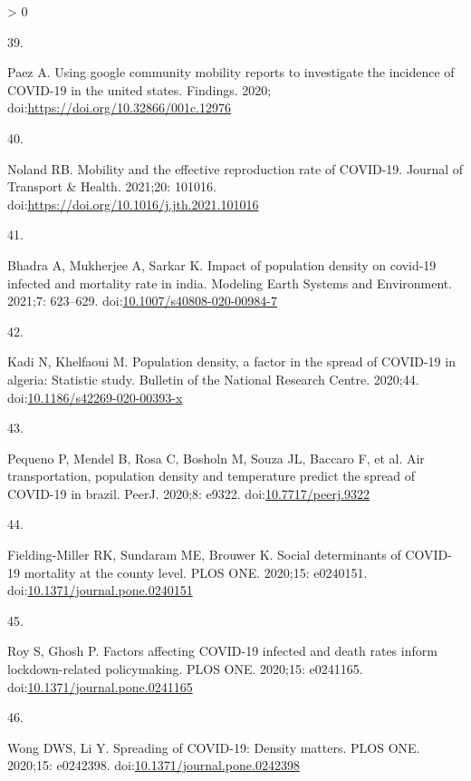 \documentclass[10pt,letterpaper]{article}
\newlength{\csllabelwidth}
\newlength{\cslhangindent}
\newenvironment{CSLReferences}[3] %
 {%
  \setlength{\parindent}{0pt}
  \ifodd #1 \everypar{\setlength{\hangindent}{\cslhangindent}}\ignorespaces\fi
  \ifnum #2 > 0
  \setlength{\parskip}{#2\baselineskip}
  \fi
 }%
 {}
\newcommand{\CSLLeftMargin}[1]{\parbox[t]{\csllabelwidth}{#1}}
\newcommand{\CSLRightInline}[1]{\parbox[t]{\linewidth - \csllabelwidth}{#1}}
\begin{document}
\begin{CSLReferences}{0}{0}
\leavevmode\hypertarget{ref-Paez2020using}{}%
\CSLLeftMargin{39. }
\CSLRightInline{Paez A. Using google community mobility reports to
investigate the incidence of COVID-19 in the united states. Findings.
2020; doi:\url{https://doi.org/10.32866/001c.12976}}

\leavevmode\hypertarget{ref-Noland2021mobility}{}%
\CSLLeftMargin{40. }
\CSLRightInline{Noland RB. Mobility and the effective reproduction rate
of COVID-19. Journal of Transport \& Health. 2021;20: 101016.
doi:\url{https://doi.org/10.1016/j.jth.2021.101016}}

\leavevmode\hypertarget{ref-Bhadra2021impact}{}%
\CSLLeftMargin{41. }
\CSLRightInline{Bhadra A, Mukherjee A, Sarkar K. Impact of population
density on covid-19 infected and mortality rate in india. Modeling Earth
Systems and Environment. 2021;7: 623--629.
doi:\href{https://doi.org/10.1007/s40808-020-00984-7}{10.1007/s40808-020-00984-7}}

\leavevmode\hypertarget{ref-Kadi2020population}{}%
\CSLLeftMargin{42. }
\CSLRightInline{Kadi N, Khelfaoui M. Population density, a factor in the
spread of COVID-19 in algeria: Statistic study. Bulletin of the National
Research Centre. 2020;44.
doi:\href{https://doi.org/10.1186/s42269-020-00393-x}{10.1186/s42269-020-00393-x}}

\leavevmode\hypertarget{ref-Pequeno2020air}{}%
\CSLLeftMargin{43. }
\CSLRightInline{Pequeno P, Mendel B, Rosa C, Bosholn M, Souza JL,
Baccaro F, et al. Air transportation, population density and temperature
predict the spread of COVID-19 in brazil. PeerJ. 2020;8: e9322.
doi:\href{https://doi.org/10.7717/peerj.9322}{10.7717/peerj.9322}}

\leavevmode\hypertarget{ref-Fielding2020social}{}%
\CSLLeftMargin{44. }
\CSLRightInline{Fielding-Miller RK, Sundaram ME, Brouwer K. Social
determinants of COVID-19 mortality at the county level. PLOS ONE.
2020;15: e0240151.
doi:\href{https://doi.org/10.1371/journal.pone.0240151}{10.1371/journal.pone.0240151}}

\leavevmode\hypertarget{ref-Roy2020factors}{}%
\CSLLeftMargin{45. }
\CSLRightInline{Roy S, Ghosh P. Factors affecting COVID-19 infected and
death rates inform lockdown-related policymaking. PLOS ONE. 2020;15:
e0241165.
doi:\href{https://doi.org/10.1371/journal.pone.0241165}{10.1371/journal.pone.0241165}}

\leavevmode\hypertarget{ref-Wong2020spreading}{}%
\CSLLeftMargin{46. }
\CSLRightInline{Wong DWS, Li Y. Spreading of COVID-19: Density matters.
PLOS ONE. 2020;15: e0242398.
doi:\href{https://doi.org/10.1371/journal.pone.0242398}{10.1371/journal.pone.0242398}}


\end{CSLReferences}
\end{document}
